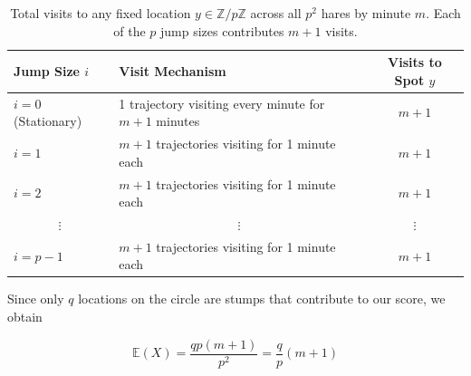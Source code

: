 \documentclass{article}
\begin{document}
\begin{table}[H]
\centering
\renewcommand{\arraystretch}{1.3}
\begin{tabularx}{0.95\textwidth}{@{}lXc@{}}
\toprule
\textbf{Jump Size} $i$ & \textbf{Visit Mechanism} & \textbf{Visits to Spot $y$} \\ \midrule
$i = 0$ (Stationary) & 1 trajectory visiting every minute for $m+1$ minutes & $m+1$ \\
$i = 1$ & $m+1$ trajectories visiting for 1 minute each & $m+1$ \\
$i = 2$ & $m+1$ trajectories visiting for 1 minute each & $m+1$ \\
\multicolumn{1}{c}{$\vdots$} & \multicolumn{1}{c}{$\vdots$} & $\vdots$ \\
$i = p-1$ & $m+1$ trajectories visiting for 1 minute each & $m+1$ \\
\bottomrule
\end{tabularx}
\caption{Total visits to any fixed location $y \in \mathbb{Z}/p\mathbb{Z}$ across all $p^2$ hares by minute $m$. Each of the $p$ jump sizes contributes $m+1$ visits.}
\label{tab:perfect_symmetry}
\end{table}

Since only $q$ locations on the circle are stumps that contribute to our score, we obtain

\begin{equation}
\mathbb{E}(X) = \frac{q p (m+1)}{p^2} = \frac{q}{p}(m+1)
\label{eq:first-moment}
\end{equation}
\end{document}
